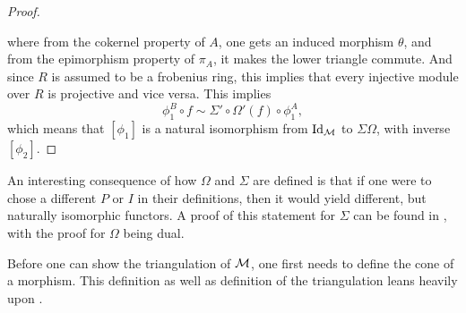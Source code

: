 \begin{proof}
\begin{center}
    \end{center}
    where from the cokernel property of \( A \), one gets an induced morphism \( \theta \), and from the epimorphism property of \( \pi_A \), it makes the lower triangle commute. And since \( R \) is assumed to be a frobenius ring, this implies that every injective module over \( R \) is projective and vice versa. This implies
    \[
        \phi_1^B \circ f \sim \Sigma' \circ \Omega'(f) \circ \phi_1^A,
    \]
    which means that \( [\phi_1] \) is a natural isomorphism from \( \operatorname{Id}_{{\mathcal{M}}} \) to \( \Sigma \Omega \), with inverse \( [\phi_2] \).
\end{proof}

An interesting consequence of how \( \Omega \) and \( \Sigma \) are defined is that if one were to chose a different \( P \) or \( I \) in their definitions, then it would yield different, but naturally isomorphic functors. A proof of this statement for \( \Sigma \) can be found in \cite[Remark on p. 13]{Happel_1988}, with the proof for \( \Omega \) being dual.

Before one can show the triangulation of \( {\mathcal{M}} \), one first needs to define the cone of a morphism. This definition as well as definition of the triangulation leans heavily upon \cite[Chapter 1, Subsection 2.5]{Happel_1988}.

